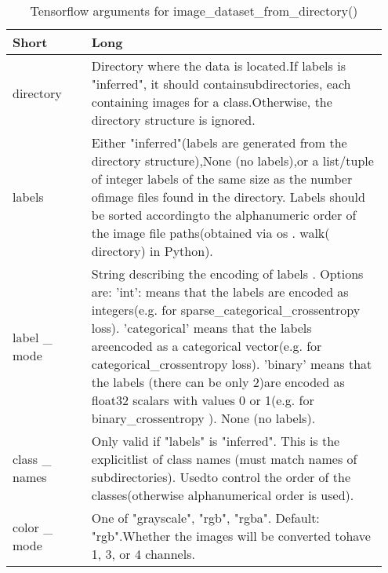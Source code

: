 \documentclass[
	letterpaper, %
	10pt, %
	unnumberedsections, %
	twoside, %
]{LTJournalArticle}
\begin{document}
\begin{table*}[ht!] %
	\caption{Tensorflow arguments for image\_dataset\_from\_directory()}
	\centering %
	\begin{tabular}{L{0.2\linewidth} L{0.75\linewidth}}
		\toprule
		Short & Long \\
		\midrule
        directory                     & Directory where the data is located.If labels is "inferred", it should containsubdirectories, each containing images for a class.Otherwise, the directory structure is ignored.                                                                                                                                                                                                                                                          \\
        labels                        & Either "inferred"(labels are generated from the directory structure),None (no labels),or a list/tuple of integer labels of the same size as the number ofimage files found in the directory. Labels should be sorted accordingto the alphanumeric order of the image file paths(obtained via os . walk( directory) in Python).                                                                                                           \\
        label \_ mode                 & String describing the encoding of labels . Options are: 'int': means that the labels are encoded as integers(e.g. for sparse\_categorical\_crossentropy loss). 'categorical' means that the labels areencoded as a categorical vector(e.g. for categorical\_crossentropy loss). 'binary' means that the labels (there can be only 2)are encoded as float32 scalars with values 0 or 1(e.g. for binary\_crossentropy ). None (no labels). \\
        class \_ names                & Only valid if "labels" is "inferred". This is the explicitlist of class names (must match names of subdirectories). Usedto control the order of the classes(otherwise alphanumerical order is used).                                                                                                                                                                                                                                     \\
        color \_ mode                 & One of "grayscale", "rgb", "rgba". Default: "rgb".Whether the images will be converted tohave 1, 3, or 4 channels.                                                                                                                                                                                                                                                                                                                       \\

\end{tabular}
\end{table*}
\end{document}
